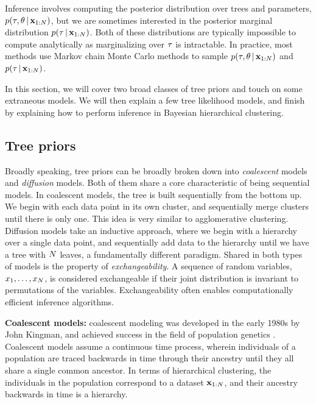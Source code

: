 Inference involves computing the posterior
distribution over trees and parameters, 
$p(\tau, \theta \,|\, \mathbf{x}_{1:N})$, but we are sometimes interested
in the
posterior marginal distribution $p(\tau \,|\, \mathbf{x}_{1:N})$.
Both of these distributions are typically
impossible to compute
analytically as marginalizing over $\tau$
is intractable.
In practice, most methods use Markov chain Monte Carlo
methods to sample $p(\tau, \theta \,|\, \mathbf{x}_{1:N})$
and $p(\tau \,|\, \mathbf{x}_{1:N})$.

In this section, we will cover two broad
classes of tree priors and touch on
some extraneous models. We will then explain
a few tree likelihood models, and 
finish by explaining how to perform
inference in Bayesian hierarchical clustering.

\subsection{Tree priors}

Broadly speaking, 
tree priors can be broadly broken down into 
\emph{coalescent} models
and 
\emph{diffusion} models.
Both of them share a core characteristic
of being sequential models.
In coalescent models, the tree is built sequentially
from the bottom up. We begin with each
data point in its own cluster,
and sequentially merge clusters until
there is only one. This idea is
very similar to agglomerative clustering.
Diffusion models take an inductive approach,
where we begin with a hierarchy over a single
data point, and sequentially add data to the hierarchy until
we have a tree with $N$ leaves,
a fundamentally different paradigm.
Shared in both types of models is the property
of
\emph{exchangeability}.
A sequence of random variables, $x_1, \ldots, x_N$,
is considered exchangeable
if their joint distribution
is invariant to permutations of the variables.
Exchangeability often enables computationally efficient
inference algorithms.

\textbf{Coalescent models:} 
coalescent modeling was developed
in the early 1980s by John Kingman,
and achieved success in the field
of population genetics
\citep{Kingman1982}.
Coalescent models assume a
continuous time process,
wherein individuals of a population
are traced backwards in time
through their ancestry until
they all share a single common ancestor.
In terms of hierarchical clustering,
the individuals in the population
correspond to a dataset $\mathbf{x}_{1:N}$,
and their
ancestry backwards in time
is a hierarchy.

